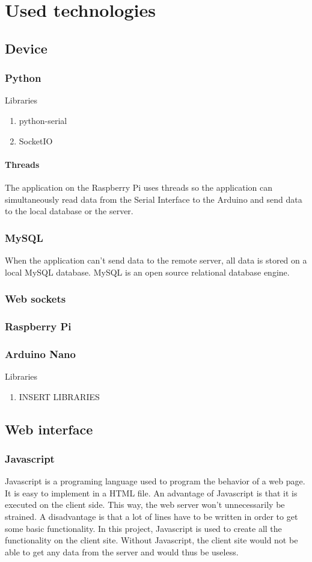 \section{Used technologies}
\subsection{Device}
\subsubsection{Python}
Libraries
\begin{enumerate}
 \item python-serial
 \item SocketIO
\end{enumerate}
\paragraph{Threads}
The application on the Raspberry Pi uses threads so the application can simultaneously read data from the Serial Interface to the Arduino and send data to the local database or the server.
\subsubsection{MySQL}
When the application can't send data to the remote server, all data is stored on a local MySQL database. MySQL is an open source relational database engine.
\subsubsection{Web sockets}
\subsubsection{Raspberry Pi}
\subsubsection{Arduino Nano}
Libraries
\begin{enumerate}
 \item INSERT LIBRARIES
\end{enumerate}

\subsection{Web interface}
\subsubsection{Javascript}
Javascript is a programing language used to program the behavior of a web page. It is easy to implement in a HTML file. An advantage of Javascript is that it is executed on the client side. This way, the web server won't unnecessarily be strained. A disadvantage is that a lot of lines have to be written in order to get some basic functionality. 
In this project, Javascript is used to create all the functionality on the client site. Without Javascript, the client site would not be able to get any data from the server and would thus be useless. 

